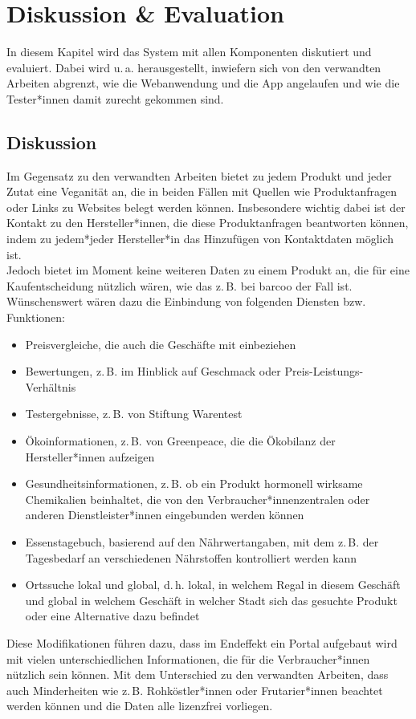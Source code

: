 \chapter{Diskussion \& Evaluation}
\label{chap:disc_eval}
\label{chap:discussion}
\label{chap:evaluation}

In diesem Kapitel wird das System \name mit allen Komponenten diskutiert und 
evaluiert.
Dabei wird u.\,a. herausgestellt, inwiefern sich \name von den verwandten 
Arbeiten abgrenzt, wie die Webanwendung und die App angelaufen und wie die 
Tester*innen damit zurecht gekommen sind.

\section{Diskussion}
\label{sec:discussion}

Im Gegensatz zu den verwandten Arbeiten bietet \name zu jedem Produkt und jeder 
Zutat eine Veganität an, die in beiden Fällen mit Quellen wie Produktanfragen 
oder Links zu Websites belegt werden können. Insbesondere wichtig dabei ist der 
Kontakt zu den Hersteller*innen, die diese Produktanfragen beantworten können, 
indem zu jedem*jeder Hersteller*in das Hinzufügen von Kontaktdaten möglich 
ist.\\
Jedoch bietet \name im Moment keine weiteren Daten zu einem Produkt an, die für 
eine Kaufentscheidung nützlich wären, wie das z.\,B. bei barcoo der Fall ist.
Wünschenswert wären dazu die Einbindung von folgenden Diensten bzw. Funktionen:
\begin{itemize}
  \item Preisvergleiche, die auch die Geschäfte mit einbeziehen
  \item Bewertungen, z.\,B. im Hinblick auf Geschmack oder 
Preis-Leistungs-Verhältnis
  \item Testergebnisse, z.\,B. von Stiftung Warentest
  \item Ökoinformationen, z.\,B. von Greenpeace, die die Ökobilanz der 
Hersteller*innen aufzeigen
  \item Gesundheitsinformationen, z.\,B. ob ein Produkt hormonell wirksame 
Chemikalien beinhaltet, die von den Verbraucher*innenzentralen oder anderen 
Dienstleister*innen eingebunden werden können
  \item Essenstagebuch, basierend auf den Nährwertangaben, mit dem z.\,B. der 
Tagesbedarf an verschiedenen Nährstoffen kontrolliert werden kann
  \item Ortssuche lokal und global, d.\,h. lokal, in welchem Regal in 
diesem Geschäft und global in welchem Geschäft in 
welcher Stadt sich das gesuchte Produkt oder eine Alternative dazu befindet
\end{itemize}
Diese Modifikationen führen dazu, dass im Endeffekt ein Portal aufgebaut 
wird mit vielen unterschiedlichen Informationen, die für die Verbraucher*innen 
nützlich sein können. Mit dem Unterschied zu den verwandten Arbeiten, dass auch 
Minderheiten wie z.\,B. Rohköstler*innen oder Frutarier*innen beachtet werden 
können und die Daten alle lizenzfrei vorliegen.

